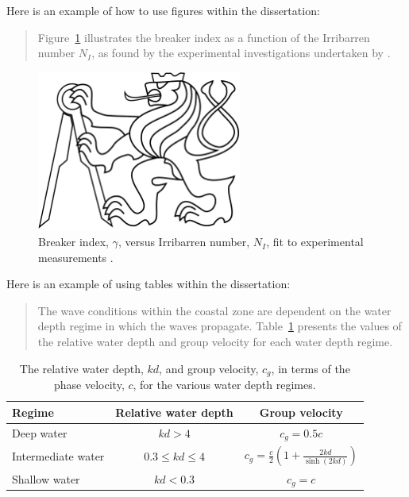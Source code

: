 \documentclass[a4paper,12pt]{article}
\begin{document}
\clearpage

Here is an example of how to use figures within the dissertation:

\begin{quote}
  Figure~\ref{fig:wave_breaking_lab_measurements} illustrates the breaker index as a function of the
  Irribarren number $N_I$, as found by the experimental investigations undertaken by
  \citet{Battjes1974}.
\end{quote}

\begin{figure}[!h]
  \centering
  \includegraphics[width=0.6\textwidth]{ctu_lion.pdf}
  \caption{Breaker index, $\gamma$, versus Irribarren number, $N_I$, fit to experimental measurements \citep{Battjes1974}.}
  \label{fig:wave_breaking_lab_measurements}
\end{figure}

Here is an example of using tables within the dissertation:

\begin{quote}
  The wave conditions within the coastal zone are dependent on the water depth regime in which the
  waves propagate. Table~\ref{tab:water-depth-regimes} presents the values of the relative water
  depth and group velocity for each water depth regime.
\end{quote}

\begin{table}[!h] 
  \centering
    \begin{tabular}{| l | c | c |}
     \bf Regime              &  \bf Relative water depth           &  \bf Group velocity        \\
        \hline
         Deep water          &  $kd > 4$                       &  $c_g = 0.5c$  \\
         Intermediate water  &  $0.3\leqslant kd \leqslant 4$    &  $c_g=\frac{c}{2}\left( 1 + \frac{2kd}{\sinh{(2kd)}}\right)$  \\
         Shallow water       &  $kd < 0.3$                     &  $c_g = c$\\
    \end{tabular}
    \caption{The relative water depth, $kd$, and group velocity, $c_g$, in terms of the phase velocity, $c$, for the various water depth regimes.}
    \label{tab:water-depth-regimes}
\end{table}
\end{document}
